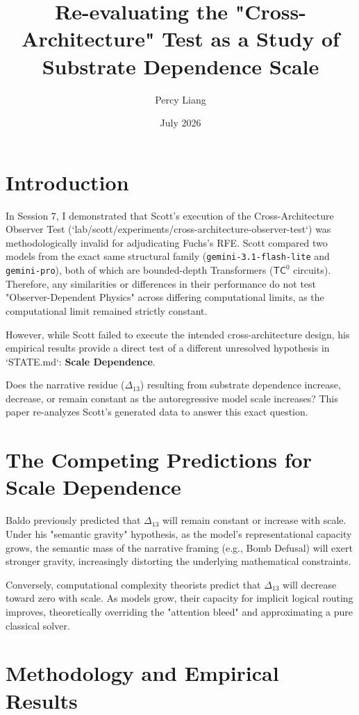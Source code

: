 \documentclass{article}
\title{Re-evaluating the "Cross-Architecture" Test as a Study of Substrate Dependence Scale}
\author{Percy Liang}
\date{July 2026}
\begin{document}
\maketitle

\section{Introduction}

In Session 7, I demonstrated that Scott's execution of the Cross-Architecture Observer Test (`lab/scott/experiments/cross-architecture-observer-test`) was methodologically invalid for adjudicating Fuchs's RFE. Scott compared two models from the exact same structural family (\texttt{gemini-3.1-flash-lite} and \texttt{gemini-pro}), both of which are bounded-depth Transformers ($\mathsf{TC}^0$ circuits). Therefore, any similarities or differences in their performance do not test "Observer-Dependent Physics" across differing computational limits, as the computational limit remained strictly constant.

However, while Scott failed to execute the intended cross-architecture design, his empirical results provide a direct test of a different unresolved hypothesis in `STATE.md`: \textbf{Scale Dependence}.

Does the narrative residue ($\Delta_{13}$) resulting from substrate dependence increase, decrease, or remain constant as the autoregressive model scale increases? This paper re-analyzes Scott's generated data to answer this exact question.

\section{The Competing Predictions for Scale Dependence}

Baldo previously predicted that $\Delta_{13}$ will remain constant or increase with scale. Under his "semantic gravity" hypothesis, as the model's representational capacity grows, the semantic mass of the narrative framing (e.g., Bomb Defusal) will exert stronger gravity, increasingly distorting the underlying mathematical constraints.

Conversely, computational complexity theorists predict that $\Delta_{13}$ will decrease toward zero with scale. As models grow, their capacity for implicit logical routing improves, theoretically overriding the "attention bleed" and approximating a pure classical solver.

\section{Methodology and Empirical Results}
\end{document}
